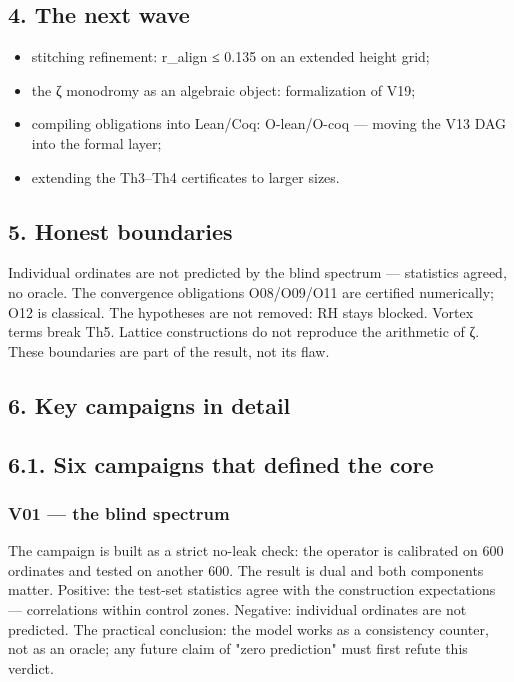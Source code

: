 \documentclass[11pt,a4paper]{article}
\begin{document}
\subsection{4. The next wave}

\begin{itemize}
  \item stitching refinement: r\_align ≤ 0.135 on an extended height grid;
  \item the ζ monodromy as an algebraic object: formalization of V19;
  \item compiling obligations into Lean/Coq: O-lean/O-coq — moving the V13 DAG into the formal layer;
  \item extending the Th3–Th4 certificates to larger sizes.
\end{itemize}

\subsection{5. Honest boundaries}

Individual ordinates are not predicted by the blind spectrum — statistics agreed, no oracle. The convergence obligations O08/O09/O11 are certified numerically; O12 is classical. The hypotheses are not removed: RH stays blocked. Vortex terms break Th5. Lattice constructions do not reproduce the arithmetic of ζ. These boundaries are part of the result, not its flaw.

\subsection{6. Key campaigns in detail}

\subsection{6.1. Six campaigns that defined the core}

\subsubsection{V01 — the blind spectrum}

The campaign is built as a strict no-leak check: the operator is calibrated on 600 ordinates and tested on another 600. The result is dual and both components matter. Positive: the test-set statistics agree with the construction expectations — correlations within control zones. Negative: individual ordinates are not predicted. The practical conclusion: the model works as a consistency counter, not as an oracle; any future claim of "zero prediction" must first refute this verdict.
\end{document}
